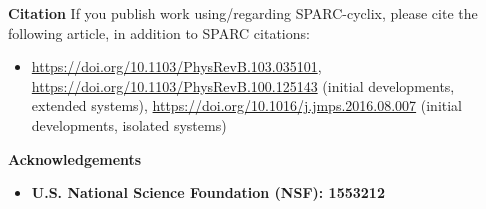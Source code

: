 \begin{frame}[allowframebreaks]{\textbf{Citation}} \label{Citation}
If you publish work using/regarding SPARC-cyclix, please cite the following article, in addition to SPARC citations:
\begin{itemize}
    \item \url{https://doi.org/10.1103/PhysRevB.103.035101}, \url{https://doi.org/10.1103/PhysRevB.100.125143} (initial developments, extended systems), \url{https://doi.org/10.1016/j.jmps.2016.08.007} (initial developments, isolated systems)
\end{itemize}
\end{frame}


\begin{frame}[allowframebreaks]{\textbf{Acknowledgements}} \label{Acknowledgements}
\begin{itemize}
    \item \textbf{U.S. National Science Foundation (NSF): 1553212 
        } \\
\end{itemize}
\end{frame}


